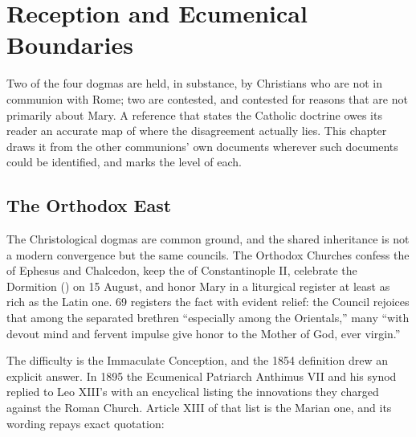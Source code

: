 \sectionguard
\section{Reception and Ecumenical Boundaries}

Two of the four dogmas are held, in substance, by Christians who are not
in communion with Rome; two are contested, and contested for reasons that
are not primarily about Mary. A reference that states the Catholic
doctrine owes its reader an accurate map of where the disagreement
actually lies. This chapter draws it from the other communions' own
documents wherever such documents could be identified, and marks the
level of each.

\subsection*{The Orthodox East}

The Christological dogmas are common ground, and the shared inheritance
is not a modern convergence but the same councils. The Orthodox
Churches confess the  of Ephesus and Chalcedon, keep the
 of Constantinople II, celebrate the Dormition
() on 15 August, and honor Mary in a liturgical register
at least as rich as the Latin one.  69 registers the
fact with evident relief: the Council rejoices that among the separated
brethren ``especially among the Orientals,'' many ``with devout mind and
fervent impulse give honor to the Mother of God, ever
virgin.''

The difficulty is the Immaculate Conception, and the 1854 definition drew
an explicit answer. In 1895 the Ecumenical Patriarch Anthimus VII and his
synod replied to Leo XIII's  with an
encyclical listing the innovations they charged against the Roman Church.
Article XIII of that list is the Marian one, and its wording repays exact
quotation:

